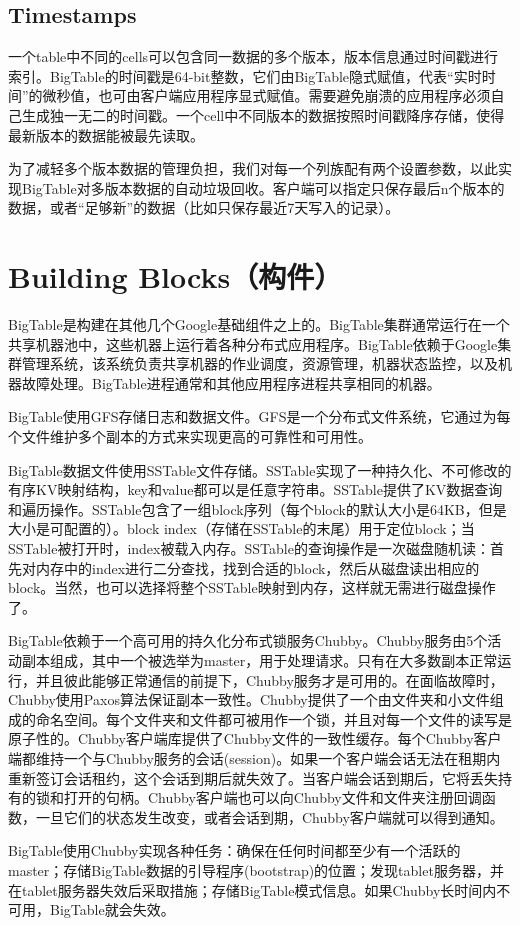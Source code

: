 \documentclass{article}
\begin{document}
\subsection{Timestamps}
一个table中不同的cells可以包含同一数据的多个版本，版本信息通过时间戳进行索引。BigTable的时间戳是64-bit整数，它们由BigTable隐式赋值，代表“实时时间”的微秒值，也可由客户端应用程序显式赋值。需要避免崩溃的应用程序必须自己生成独一无二的时间戳。一个cell中不同版本的数据按照时间戳降序存储，使得最新版本的数据能被最先读取。\par
为了减轻多个版本数据的管理负担，我们对每一个列族配有两个设置参数，以此实现BigTable对多版本数据的自动垃圾回收。客户端可以指定只保存最后n个版本的数据，或者“足够新”的数据（比如只保存最近7天写入的记录）。

\section{Building Blocks（构件）}
BigTable是构建在其他几个Google基础组件之上的。BigTable集群通常运行在一个共享机器池中，这些机器上运行着各种分布式应用程序。BigTable依赖于Google集群管理系统，该系统负责共享机器的作业调度，资源管理，机器状态监控，以及机器故障处理。BigTable进程通常和其他应用程序进程共享相同的机器。\par
BigTable使用GFS存储日志和数据文件。GFS是一个分布式文件系统，它通过为每个文件维护多个副本的方式来实现更高的可靠性和可用性。\par
BigTable数据文件使用SSTable文件存储。SSTable实现了一种持久化、不可修改的有序KV映射结构，key和value都可以是任意字符串。SSTable提供了KV数据查询和遍历操作。SSTable包含了一组block序列（每个block的默认大小是64KB，但是大小是可配置的）。block index（存储在SSTable的末尾）用于定位block；当SSTable被打开时，index被载入内存。SSTable的查询操作是一次磁盘随机读：首先对内存中的index进行二分查找，找到合适的block，然后从磁盘读出相应的block。当然，也可以选择将整个SSTable映射到内存，这样就无需进行磁盘操作了。\par
BigTable依赖于一个高可用的持久化分布式锁服务Chubby。Chubby服务由5个活动副本组成，其中一个被选举为master，用于处理请求。只有在大多数副本正常运行，并且彼此能够正常通信的前提下，Chubby服务才是可用的。在面临故障时，Chubby使用Paxos算法保证副本一致性。Chubby提供了一个由文件夹和小文件组成的命名空间。每个文件夹和文件都可被用作一个锁，并且对每一个文件的读写是原子性的。Chubby客户端库提供了Chubby文件的一致性缓存。每个Chubby客户端都维持一个与Chubby服务的会话(session)。如果一个客户端会话无法在租期内重新签订会话租约，这个会话到期后就失效了。当客户端会话到期后，它将丢失持有的锁和打开的句柄。Chubby客户端也可以向Chubby文件和文件夹注册回调函数，一旦它们的状态发生改变，或者会话到期，Chubby客户端就可以得到通知。\par
BigTable使用Chubby实现各种任务：确保在任何时间都至少有一个活跃的master；存储BigTable数据的引导程序(bootstrap)的位置；发现tablet服务器，并在tablet服务器失效后采取措施；存储BigTable模式信息。如果Chubby长时间内不可用，BigTable就会失效。
\end{document}
